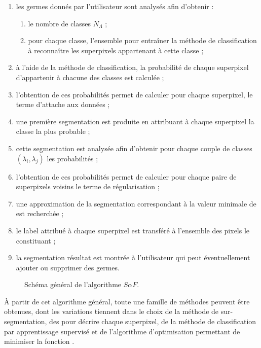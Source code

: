 \begin{enumerate}
\item les germes donnés par l'utilisateur sont analysés afin d'obtenir :
\begin{enumerate}
\item le nombre de classes $N_{\Lambda}$ ;
\item pour chaque classe, l'ensemble  pour entraîner la méthode de classification à reconnaître les superpixels appartenant à cette classe ;
\end{enumerate}
\item à l'aide de la méthode de classification, la probabilité de chaque superpixel d'appartenir à chacune des classes est calculée ;
\item l'obtention de ces probabilités permet de calculer\modif{,} pour chaque superpixel, le terme d'attache aux données  ;
\item une première segmentation est produite en attribuant à chaque superpixel la classe la plus probable ;
\item cette segmentation est analysée afin d'obtenir pour chaque couple de classes $(\lambda_{i}, \lambda_{j})$ les probabilités  ;
\item l'obtention de ces probabilités permet de calculer pour chaque paire de superpixels voisins le terme de régularisation  ;
\item une approximation de la segmentation correspondant à la valeur minimale de  est recherchée ;
\item le label attribué à chaque superpixel est transféré à l'ensemble des pixels le constituant ;
\item la segmentation résultat est montrée à l'utilisateur qui peut éventuellement ajouter ou supprimer des germes. 
\end{enumerate}

\begin{figure}[htbp]
\begin{center}
\scalebox{.5}{

}
\caption{Schéma général de l'algorithme $S \alpha F$.}
\label{fig:saf:algo}
\end{center}
\end{figure}

À partir de cet algorithme général, toute une famille de méthodes peuvent être obtenues, dont les variations tiennent dans le choix de la méthode de sur-segmentation, des  pour décrire chaque superpixel, de la méthode de classification par apprentissage supervisé et de l'algorithme d'optimisation permettant de minimiser la fonction .

